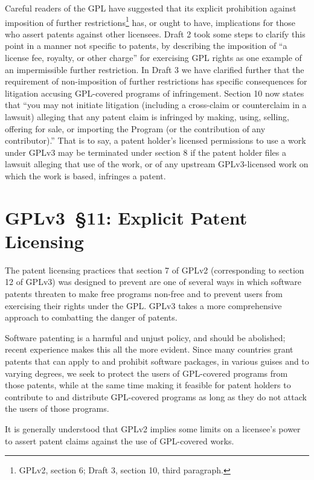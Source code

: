 Careful readers of the GPL have suggested that its explicit prohibition
against imposition of further restrictions\footnote{GPLv2, section 6; Draft
  3, section 10, third paragraph.} has, or ought to have, implications for
those who assert patents against other licensees.  Draft 2 took some steps to
clarify this point in a manner not specific to patents, by describing the
imposition of ``a license fee, royalty, or other charge'' for exercising GPL
rights as one example of an impermissible further restriction.  In Draft 3 we
have clarified further that the requirement of non-imposition of further
restrictions has specific consequences for litigation accusing GPL-covered
programs of infringement.  Section 10 now states that ``you may not initiate
litigation (including a cross-claim or counterclaim in a lawsuit) alleging
that any patent claim is infringed by making, using, selling, offering for
sale, or importing the Program (or the contribution of any contributor).''
That is to say, a patent holder's licensed permissions to use a work under
GPLv3 may be terminated under section 8 if the patent holder files a lawsuit
alleging that use of the work, or of any upstream GPLv3-licensed work on
which the work is based, infringes a patent.

\section{GPLv3~\S11: Explicit Patent Licensing}
\label{GPLv3s11}

The patent licensing practices that section 7 of GPLv2 (corresponding to
section 12 of GPLv3) was designed to prevent are one of several ways in which
software patents threaten to make free programs non-free and to prevent users
from exercising their rights under the GPL. GPLv3 takes a more comprehensive
approach to combatting the danger of patents.

Software patenting is a harmful and unjust policy, and should be abolished;
recent experience makes this all the more evident. Since many countries grant
patents that can apply to and prohibit software packages, in various guises
and to varying degrees, we seek to protect the users of GPL-covered programs
from those patents, while at the same time making it feasible for patent
holders to contribute to and distribute GPL-covered programs as long as they
do not attack the users of those programs.

It is generally understood that GPLv2 implies some limits on a licensee's
power to assert patent claims against the use of GPL-covered works.

